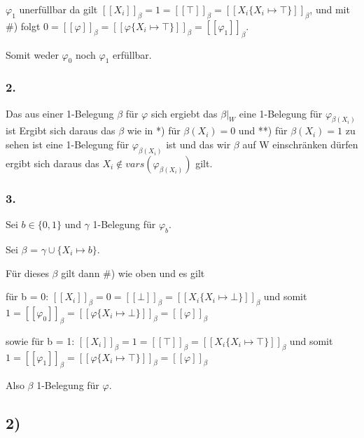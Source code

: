 \hfill

$\varphi_1$ unerfüllbar da gilt $[\![X_i]\!]_\beta = 1 = [\![\top]\!]_\beta = [\![X_i\{X_i \mapsto \top\}]\!]_\beta$, und mit \#) folgt $0 = [\![\varphi]\!]_\beta = [\![\varphi\{X_i \mapsto \top\}]\!]_\beta = [\![\varphi_1]\!]_\beta$.

\hfill

Somit weder $\varphi_0$ noch $\varphi_1$ erfüllbar.

\subsubsection*{2.}
Das aus einer 1-Belegung $\beta$ für $\varphi$ sich ergiebt das $\beta|_W$ eine 1-Belegung für $\varphi_{\beta(X_i)}$ ist Ergibt sich daraus das $\beta$ wie in *) für $\beta(X_i) = 0$ und **) für $\beta(X_i) = 1$ zu sehen ist eine 1-Belegung für $\varphi_{\beta(X_i)}$ ist und das wir $\beta$ auf W einschränken dürfen ergibt sich daraus das $X_i \notin vars(\varphi_{\beta(X_i)})$ gilt.  

\subsubsection*{3.}
Sei $b \in \{0,1\}$ und $\gamma$ 1-Belegung für $\varphi_b$.

Sei $\beta$ = $\gamma \cup \{X_i \mapsto b\}$.

Für dieses $\beta$ gilt dann \#) wie oben und es gilt 

für b = 0: $[\![X_i]\!]_\beta = 0 = [\![\bot]\!]_\beta = [\![X_i\{X_i \mapsto \bot\}]\!]_\beta$ 
und somit $1 = [\![\varphi_0]\!]_\beta = [\![\varphi\{X_i \mapsto \bot\}]\!]_\beta = [\![\varphi]\!]_\beta$

sowie für b = 1: $[\![X_i]\!]_\beta = 1 = [\![\top]\!]_\beta = [\![X_i\{X_i \mapsto \top\}]\!]_\beta$
und somit $1 = [\![\varphi_1]\!]_\beta = [\![\varphi\{X_i \mapsto \top\}]\!]_\beta = [\![\varphi]\!]_\beta$

Also $\beta$ 1-Belegung für $\varphi$.

\subsection*{2)}